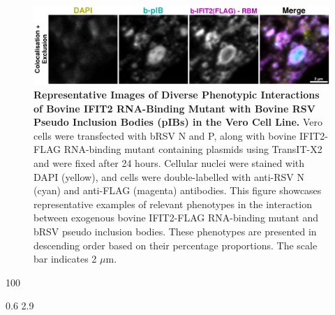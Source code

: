 \begin{figure}
    \centering
    \includegraphics[width=1\linewidth]{09. Chapter 4/Figs/01. pIB/03. IFIT2/05. IFIT2-RNA binding mutant/02. pIB/06. bi2f24-bnbp.pdf}
    \caption[Representative Images of Diverse Phenotypic Interactions of Bovine IFIT2 RNA-Binding Mutant with Bovine RSV Pseudo Inclusion Bodies (pIBs) in the Vero Cell Line.]{\textbf{Representative Images of Diverse Phenotypic Interactions of Bovine IFIT2 RNA-Binding Mutant with Bovine RSV Pseudo Inclusion Bodies (pIBs) in the Vero Cell Line.}  Vero cells were transfected with bRSV N and P, along with bovine IFIT2-FLAG RNA-binding mutant containing plasmids using TransIT-X2 and were fixed after 24 hours. Cellular nuclei were stained with DAPI (yellow), and cells were double-labelled with anti-RSV N (cyan) and anti-FLAG (magenta) antibodies. This figure showcases representative examples of relevant phenotypes in the interaction between exogenous bovine IFIT2-FLAG RNA-binding mutant and bRSV pseudo inclusion bodies. These phenotypes are presented in descending order based on their percentage proportions. The scale bar indicates 2 \(\mu \mbox{m}\).}
    \label{fig:Representative Images of Diverse Phenotypic Interactions of Bovine IFIT2 RNA-Binding Mutant with Bovine RSV Pseudo Inclusion Bodies (pIBs) in the Vero Cell Line}
\end{figure}

100

0.6 2.9

